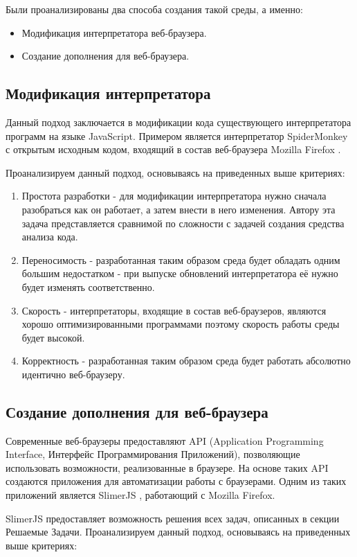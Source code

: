 	Были проанализированы два способа создания такой среды, а именно:
	\begin{itemize}
		\item Модификация интерпретатора веб-браузера.
		\item Создание дополнения для веб-браузера.
	\end{itemize}

\subsection{Модификация интерпретатора}
	Данный подход заключается в модификации кода существующего интерпретатора программ на языке JavaScript. Примером является интерпретатор SpiderMonkey \cite{spidermonkey} с открытым исходным кодом, входящий в состав веб-браузера Mozilla Firefox \cite{mozilla}. 

	Проанализируем данный подход, основываясь на приведенных выше критериях:
	\begin{enumerate}
		\item Простота разработки - для модификации интерпретатора нужно сначала разобраться как он работает, а затем внести в него изменения. Автору эта задача представляется сравнимой по сложности с задачей создания средства анализа кода.
		\item Переносимость - разработанная таким образом среда будет обладать одним большим недостатком - при выпуске обновлений интерпретатора её нужно будет изменять соответственно.
		\item Скорость - интерпретаторы, входящие в состав веб-браузеров, являются хорошо оптимизированными программами поэтому скорость работы среды будет высокой.
		\item Корректность - разработанная таким образом среда будет работать абсолютно идентично веб-браузеру.
	\end{enumerate}

\subsection{Создание дополнения для веб-браузера}
	Современные веб-браузеры предоставляют API (Application Programming Interface, Интерфейс Программирования Приложений), позволяющие использовать возможности, реализованные в браузере. На основе таких API создаются приложения для автоматизации работы с браузерами. Одним из таких приложений является SlimerJS \cite{slimer}, работающий с Mozilla Firefox. 


	SlimerJS предоставляет возможность решения всех задач, описанных в секции Решаемые Задачи. Проанализируем данный подход, основываясь на приведенных выше критериях:


